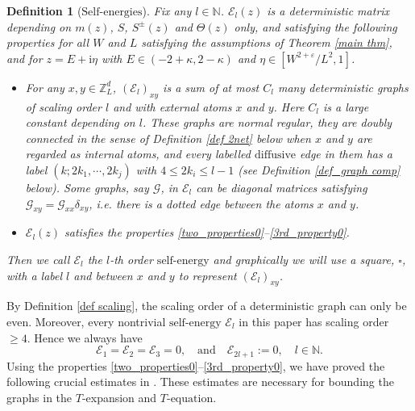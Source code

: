 \documentclass{article}
\makeatletter
\newcommand{\1}{\mathds{1}}
\numberwithin{equation}{section}
\newcommand{\be}{\begin{equation}}
\newcommand{\ee}{\end{equation}}
\newcommand{\e}{{\varepsilon}}
\renewcommand{\cal}{\mathcal}
\newcommand{\ii}{\mathrm{i}} %
\renewcommand{\leq}{\leqslant}
\renewcommand{\geq}{\geqslant}
\renewcommand{\le}{\leq}
\renewcommand{\ge}{\geq}
\newcommand{\N}{\mathbb{N}}
\newcommand{\Z}{\mathbb{Z}}
\newcommand{\dashed}{\text{diffusive}}
\newcommand{\self}{\text{self-energy}}
\newcommand{\selfs}{\text{self-energies}}
\newcommand{\Selfs}{\text{Self-energies}}
\theoremstyle{plain} %
\newtheorem{definition}[theorem]{Definition}
\theoremstyle{remark}
\newcommand{\Sdelta}{{\Sigma}_T}
\newcommand{\Sele}{{\mathcal E}}
\newcommand{\Selek}{{\mathcal E}}
\newcommand{\incomp}{{\text{$T$-equation}}}
\renewcommand{\subsection}{\@startsection
	{subsection}%
	{2}%
	{0mm}%
	{-\baselineskip}%
	{0.5\baselineskip}%
	{\normalfont\bf\itshape}} %
\makeatother
\begin{document}
\begin{definition}[$\Selfs$]\label{collection elements}
Fix any $l\in \N$. $\Sele_l(z)$ is a deterministic matrix depending on $m(z)$, $S$, $S^\pm(z)$ and $\Theta(z)$ only, and satisfying the following properties for all $W$ and $L$ satisfying the assumptions of Theorem \ref{main thm}, and for $z= E+ \ii \eta$ with $E\in (-2+\kappa, 2- \kappa)$ and $\eta\in[ W^{2+\e}/L^{2}, 1]$.

	\begin{itemize}
		\item[(i)] For any $x,y \in \Z_L^d$, $  (\Selek_{l})_{xy}$ is a sum of at most $C_l$ many deterministic graphs of scaling order $l$ and with external atoms $x$ and $y$. Here $C_l$ is a large constant depending on $l$. These graphs are normal regular, they are doubly connected in the sense of Definition \ref{def 2net} below when $x$ and $y$ are regarded as internal atoms, and every labelled $\dashed$ edge in them has a label $(k;2k_1,\cdots,2k_j)$ with $4\le 2k_i\le l-1$ (see Definition \ref{def_graph comp} below). Some graphs, say $\cal G$, in $\Sele_l$ can be diagonal matrices satisfying $  \cal G_{xy}= \cal G_{xx} \delta_{xy}$, i.e. there is a dotted edge between the atoms $x$ and $y$.
		
		\item[(ii)] $ \Selek_{l} (z)$ satisfies the properties \eqref{two_properties0}--\eqref{3rd_property0}.
		
	\end{itemize} 
	Then we call $\Selek_l$ the  $l$-th order \emph{$\self$} and graphically we will use a square, $\square$, with a label $l$ and between  $x$ and $y$ to represent $(\Sele_l)_{xy}$. 
\end{definition}



By Definition \ref{def scaling}, the scaling order of a deterministic graph can only be even. Moreover, every nontrivial $\self$ $\Selek_{l}$ in this paper has scaling order $\ge 4$. Hence we always have 
\be\label{trivial conv}
\Sele_1=\Sele_2=\Sele_3=0, \quad \text{and}\quad \Sele_{2l+1}:=0,\quad l\in \N.
\ee
Using the properties \eqref{two_properties0}--\eqref{3rd_property0}, we have proved the following crucial estimates in \cite{PartI_high}. These estimates are necessary for bounding the graphs in the $T$-expansion and $\incomp$.  
\end{document}
